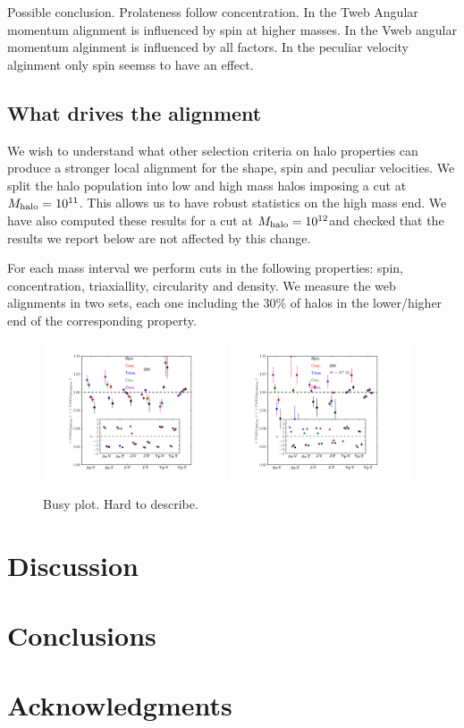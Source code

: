 \documentclass[usenatbib]{mn2e}
\newcommand{\hMsun}{{\ifmmode{h^{-1}{\rm
        {M_{\odot}}}}\else{$h^{-1}{\rm{M_{\odot}}}$}\fi}}
\begin{document}
Possible conclusion. Prolateness follow concentration. In the Tweb Angular momentum alignment is influenced by spin at higher masses. In the Vweb angular momentum alginment is influenced by all factors. In the peculiar velocity alginment only spin seemss to have an effect.

\subsection{What drives the alignment}

We wish to understand what other selection criteria on halo
properties can produce a stronger local alignment for the shape, spin
and peculiar velocities. We split the halo population into low and
high mass halos imposing a cut at $M_{\rm halo}=10^{11}$\hMsun. This
allows us to have robust statistics on the high mass end. We have also
computed these results for a cut at $M_{\rm halo}=10^{12}$\hMsun and
checked that the results we report below are not affected by this
change.

For each mass interval we perform cuts in the following properties:
spin, concentration, triaxiallity, circularity  and density. We
measure the web alignments in two sets, each one including the $30\%$
of halos in the lower/higher end of the corresponding property.


\begin{figure}
\includegraphics[width=0.48\textwidth]{../plot3/Type/256_All.png}
\includegraphics[width=0.48\textwidth]{../plot3/Type/256_Big.png}
\caption{Busy plot. Hard to describe.}
\end{figure}

\section{Discussion}
\label{sec:discussion}


\section{Conclusions}
\label{sec:conclusions}


\section*{Acknowledgments} 


 
\end{document}
